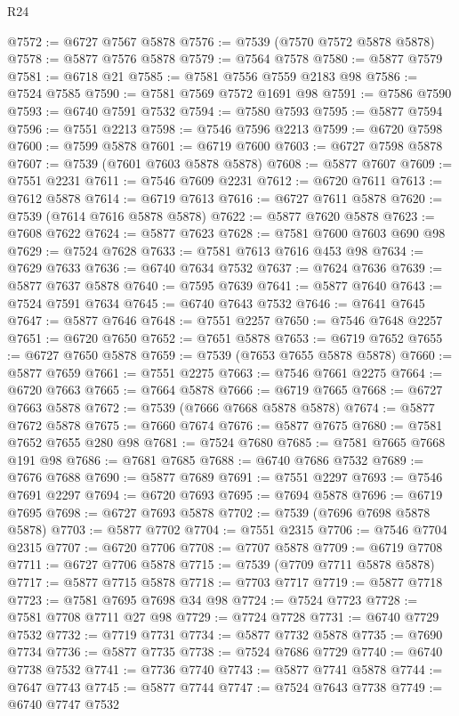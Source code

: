 \begin{lexlean}{R24}
\begin{coremodule}
{{{{{{{{{{{{{{{{{{{{{{{{{{{{{{{{{{{{{{{{{{{{{{{{{{{{{{{{{{{{{{{{{{{{{{{{{{{{{{{{{{{{{{{{{{{{{{{{{{{{{{{{{{{{{{{{{{{{{{{{{{{{{{{{{{{{{{{{{{{{{{{{{{{{{{{{{{{{{{{{{{{{{{{{{{{{{{{{{{{{{{{{{{{{{{{{{{{@7572 := @6727 @7567 @5878
@7576 := @7539 (@7570 @7572 @5878 @5878)
@7578 := @5877 @7576 @5878
@7579 := @7564 @7578
@7580 := @5877 @7579
@7581 := @6718 @21
@7585 := @7581 @7556 @7559 @2183 @98
@7586 := @7524 @7585
@7590 := @7581 @7569 @7572 @1691 @98
@7591 := @7586 @7590
@7593 := @6740 @7591 @7532
@7594 := @7580 @7593
@7595 := @5877 @7594
@7596 := @7551 @2213
@7598 := @7546 @7596 @2213
@7599 := @6720 @7598
@7600 := @7599 @5878
@7601 := @6719 @7600
@7603 := @6727 @7598 @5878
@7607 := @7539 (@7601 @7603 @5878 @5878)
@7608 := @5877 @7607
@7609 := @7551 @2231
@7611 := @7546 @7609 @2231
@7612 := @6720 @7611
@7613 := @7612 @5878
@7614 := @6719 @7613
@7616 := @6727 @7611 @5878
@7620 := @7539 (@7614 @7616 @5878 @5878)
@7622 := @5877 @7620 @5878
@7623 := @7608 @7622
@7624 := @5877 @7623
@7628 := @7581 @7600 @7603 @690 @98
@7629 := @7524 @7628
@7633 := @7581 @7613 @7616 @453 @98
@7634 := @7629 @7633
@7636 := @6740 @7634 @7532
@7637 := @7624 @7636
@7639 := @5877 @7637 @5878
@7640 := @7595 @7639
@7641 := @5877 @7640
@7643 := @7524 @7591 @7634
@7645 := @6740 @7643 @7532
@7646 := @7641 @7645
@7647 := @5877 @7646
@7648 := @7551 @2257
@7650 := @7546 @7648 @2257
@7651 := @6720 @7650
@7652 := @7651 @5878
@7653 := @6719 @7652
@7655 := @6727 @7650 @5878
@7659 := @7539 (@7653 @7655 @5878 @5878)
@7660 := @5877 @7659
@7661 := @7551 @2275
@7663 := @7546 @7661 @2275
@7664 := @6720 @7663
@7665 := @7664 @5878
@7666 := @6719 @7665
@7668 := @6727 @7663 @5878
@7672 := @7539 (@7666 @7668 @5878 @5878)
@7674 := @5877 @7672 @5878
@7675 := @7660 @7674
@7676 := @5877 @7675
@7680 := @7581 @7652 @7655 @280 @98
@7681 := @7524 @7680
@7685 := @7581 @7665 @7668 @191 @98
@7686 := @7681 @7685
@7688 := @6740 @7686 @7532
@7689 := @7676 @7688
@7690 := @5877 @7689
@7691 := @7551 @2297
@7693 := @7546 @7691 @2297
@7694 := @6720 @7693
@7695 := @7694 @5878
@7696 := @6719 @7695
@7698 := @6727 @7693 @5878
@7702 := @7539 (@7696 @7698 @5878 @5878)
@7703 := @5877 @7702
@7704 := @7551 @2315
@7706 := @7546 @7704 @2315
@7707 := @6720 @7706
@7708 := @7707 @5878
@7709 := @6719 @7708
@7711 := @6727 @7706 @5878
@7715 := @7539 (@7709 @7711 @5878 @5878)
@7717 := @5877 @7715 @5878
@7718 := @7703 @7717
@7719 := @5877 @7718
@7723 := @7581 @7695 @7698 @34 @98
@7724 := @7524 @7723
@7728 := @7581 @7708 @7711 @27 @98
@7729 := @7724 @7728
@7731 := @6740 @7729 @7532
@7732 := @7719 @7731
@7734 := @5877 @7732 @5878
@7735 := @7690 @7734
@7736 := @5877 @7735
@7738 := @7524 @7686 @7729
@7740 := @6740 @7738 @7532
@7741 := @7736 @7740
@7743 := @5877 @7741 @5878
@7744 := @7647 @7743
@7745 := @5877 @7744
@7747 := @7524 @7643 @7738
@7749 := @6740 @7747 @7532
}}}}}}}}}}}}}}}}}}}}}}}}}}}}}}}}}}}}}}}}}}}}}}}}}}}}}}}}}}}}}}}}}}}}}}}}}}}}}}}}}}}}}}}}}}}}}}}}}}}}}}}}}}}}}}}}}}}}}}}}}}}}}}}}}}}}}}}}}}}}}}}}}}}}}}}}}}}}}}}}}}}}}}}}}}}}}}}}}}}}}}}}}}}}}}}}}}}
\end{coremodule}
\end{lexlean}
